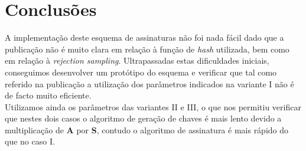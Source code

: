 \section{Conclusões}
A implementação deste esquema de assinaturas não foi nada fácil dado que a publicação não é muito clara em relação à função de \textit{hash} utilizada, bem como em relação à \textit{rejection sampling}. Ultrapassadas estas dificuldades iniciais, conseguimos desenvolver um protótipo do esquema e verificar que tal como referido na publicação a utilização dos parâmetros indicados na variante I não é de facto muito eficiente.\\
Utilizamos ainda os parâmetros das variantes II e III, o que nos permitiu verificar que nestes dois casos o algoritmo de geração de chaves é mais lento devido a multiplicação de \textbf{A} por \textbf{S}, contudo o algoritmo de assinatura é mais rápido do que no caso I.